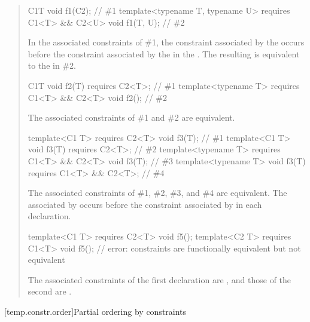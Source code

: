 \begin{quote}
\begin{codeblock}
C1{T} void f1(C2);                                                      // \#1
template<typename T, typename U> requires C1<T> && C2<U> void f1(T, U); // \#2
\end{codeblock}
% 
In the associated constraints of \#1, the constraint associated by the 
  occurs before the 
constraint associated by the  in the
 .
% 
The resulting  is equivalent to the 
 in \#2.
% 
\begin{codeblock}
C1{T} void f2(T) requires C2<T>;                        // \#1
template<typename T> requires C1<T> && C2<T> void f2(); // \#2
\end{codeblock}
The associated constraints of \#1 and \#2 are equivalent.

\begin{codeblock}
template<C1 T> requires C2<T> void f3(T);                // \#1
template<C1 T> void f3(T) requires C2<T>;                // \#2
template<typename T> requires C1<T> && C2<T> void f3(T); // \#3
template<typename T> void f3(T) requires C1<T> && C2<T>; // \#4
\end{codeblock}
The associated constraints of \#1, \#2, \#3, and \#4 are equivalent. The 
 associated by  occurs before 
the constraint associated by  in each declaration.
% 
\begin{codeblock}
template<C1 T> requires C2<T> void f5();
template<C2 T> requires C1<T> void f5(); // error: constraints are functionally equivalent but not equivalent
\end{codeblock}
% 
The associated constraints of the first declaration are
, and those of the second are
.
\exitexample
\end{quote}




[temp.constr.order]{Partial ordering by constraints}

